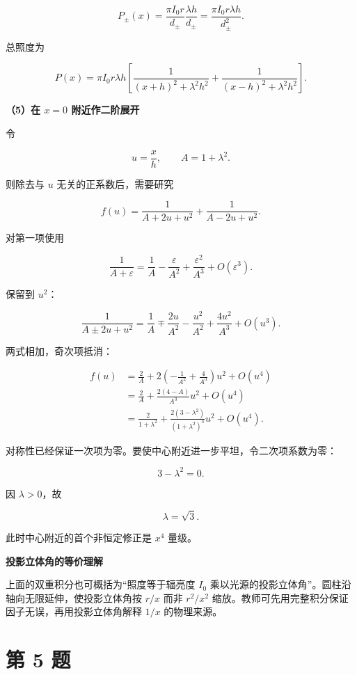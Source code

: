 \documentclass[12pt,a4paper,UTF8]{ctexart}
\begin{document}
\[
P_\pm(x)=\frac{\pi I_0r}{d_\pm}
\frac{\lambda h}{d_\pm}
=\frac{\pi I_0r\lambda h}{d_\pm^2}.
\]

总照度为

\[
\boxed{
P(x)=\pi I_0r\lambda h
\left[
\frac1{(x+h)^2+\lambda^2h^2}
+\frac1{(x-h)^2+\lambda^2h^2}
\right]
}.
\]

\textbf{（5）在 \(x=0\) 附近作二阶展开}

令

\[u=\frac xh,
\qquad A=1+\lambda^2.\]

则除去与 \(u\) 无关的正系数后，需要研究

\[
f(u)=\frac1{A+2u+u^2}
+\frac1{A-2u+u^2}.
\]

对第一项使用

\[
\frac1{A+\varepsilon}
=\frac1A-\frac{\varepsilon}{A^2}
+\frac{\varepsilon^2}{A^3}+O(\varepsilon^3).
\]

保留到 \(u^2\)：

\[
\frac1{A\pm2u+u^2}
=\frac1A
\mp\frac{2u}{A^2}
-\frac{u^2}{A^2}
+\frac{4u^2}{A^3}
+O(u^3).
\]

两式相加，奇次项抵消：

\[
\begin{aligned}
f(u)
&=\frac2A
+2\left(-\frac1{A^2}+\frac4{A^3}\right)u^2
+O(u^4)\\
&=\frac2A
+\frac{2(4-A)}{A^3}u^2
+O(u^4)\\
&=\frac2{1+\lambda^2}
+\frac{2(3-\lambda^2)}{(1+\lambda^2)^3}u^2
+O(u^4).
\end{aligned}
\]

对称性已经保证一次项为零。要使中心附近进一步平坦，令二次项系数为零：

\[3-\lambda^2=0.\]

因 \(\lambda>0\)，故

\[\boxed{\lambda=\sqrt3}.\]

此时中心附近的首个非恒定修正是 \(x^4\) 量级。

\textbf{投影立体角的等价理解}

上面的双重积分也可概括为``照度等于辐亮度 \(I_0\)
乘以光源的投影立体角''。圆柱沿轴向无限延伸，使投影立体角按 \(r/x\) 而非
\(r^2/x^2\) 缩放。教师可先用完整积分保证因子无误，再用投影立体角解释
\(1/x\) 的物理来源。

\newpage

\section{第 5 题}\label{ux7b2c-5-ux9898}
\end{document}
